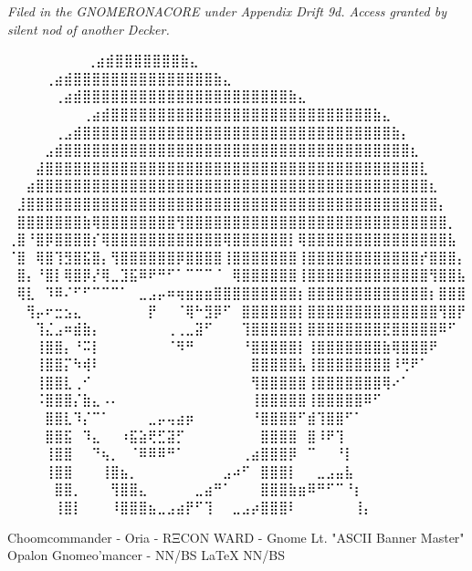 \vspace{1.5em}
\begin{flushright}
\textit{Filed in the GNOMERONACORE under Appendix Drift 9d. Access granted by silent nod of another Decker.}
\end{flushright}


\iffalse
⠀⠀⠀⠀⠀⠀             ⠀⠀⢀⣴⣾⣿⣿⣿⣿⣿⣿⣿⣷⣄⠀⠀⠀⠀⠀⠀⠀⠀
⠀⠀⠀  ⠀      ⠀⠀⠀⠀⢀⣴⣾⣿⣿⣿⣿⣿⣿⣿⣿⣿⣿⣿⣿⣿⣿⣿⣷⣄⠀⠀⠀⠀⠀⠀⠀⠀
⠀⠀ ⠀   ⠀⠀⠀⠀⠀⢀⣴⣾⣿⣿⣿⣿⣿⣿⣿⣿⣿⣿⣿⣿⣿⣿⣿⣿⣿⣿⣿⣿⣿⣿⣷⣄⠀⠀⠀⠀⠀⠀⠀⠀
⠀⠀⠀⠀⠀⠀⠀⠀⢀⣴⣾⣿⣿⣿⣿⣿⣿⣿⣿⣿⣿⣿⣿⣿⣿⣿⣿⣿⣿⣿⣿⣿⣿⣿⣿⣿⣿⣿⣿⣷⣄⠀⠀⠀⠀⠀⠀⠀⠀
⠀⠀⠀⠀⠀⢀⣠⣾⣿⣿⣿⣿⣿⣿⣿⣿⣿⣿⣿⣿⣿⣿⣿⣿⣿⣿⣿⣿⣿⣿⣿⣿⣿⣿⣿⣿⣿⣿⣿⣿⣿⣷⡄⠀⠀⠀⠀⠀⠀
⠀⠀⠀⠀⣠⣾⣿⣿⣿⣿⣿⣿⣿⣿⣿⣿⣿⣿⣿⣿⣿⣿⣿⣿⣿⣿⣿⣿⣿⣿⣿⣿⣿⣿⣿⣿⣿⣿⣿⣿⣿⣿⣿⣆⠀⠀⠀⠀⠀
⠀⠀⠀⣼⣿⣿⣿⣿⣿⣿⣿⣿⣿⣿⣿⣿⣿⣿⣿⣿⣿⣿⣿⣿⣿⣿⣿⣿⣿⣿⣿⣿⣿⣿⣿⣿⣿⣿⣿⣿⣿⣿⣿⣿⣇⠀⠀⠀⠀
⠀⠀⣴⣿⣿⣿⣿⣿⣿⣿⣿⣿⣿⣿⣿⣿⣿⣿⣿⣿⣿⣿⣿⣿⣿⣿⣿⣿⣿⣿⣿⣿⣿⣿⣿⣿⣿⣿⣿⣿⣿⣿⣿⣿⣿⣆⠀⠀⠀
⠀⣸⣿⣿⣿⣿⣿⣿⣿⣿⣿⣿⣿⣿⣿⣿⣿⣿⣿⣿⣿⣿⣿⣿⣿⣿⣿⣿⣿⣿⣿⣿⣿⣿⣿⣿⣿⣿⣿⣿⣿⣿⣿⣿⣿⣿⡄⠀⠀
⠀⣿⣿⣿⣿⣿⣿⣿⣷⢿⣿⣿⣿⣿⣿⣿⣿⣿⢻⣿⣿⣿⣿⣿⣿⣿⣿⣿⣿⣿⣿⣿⣿⣿⣿⣿⣿⣿⣿⣿⣿⣿⣿⣿⣿⣿⣿⡀⠀
⢀⣿⠘⣿⡿⣿⣿⣿⣿⡎⢿⣿⣿⣿⣿⣿⣿⣿⣿⣿⣿⣿⣿⢿⣿⣿⣿⣿⣿⣿⡇⢿⣿⣿⣿⣿⣿⣿⣿⣿⣿⣿⣿⣿⣿⣿⣿⣧⠀
⠈⣿⠀⢿⣿⢹⣻⣿⣯⣿⡄⢻⣿⣿⣿⣿⣿⣿⡿⣿⣿⣿⣿⢸⣿⣿⣿⣿⣿⣿⣿⢸⣿⣿⣿⣿⣿⣿⣿⣿⣿⣿⣿⣿⡞⣿⣿⣿⡄
⠀⣿⡄⠘⣿⡇⢿⣿⡿⡜⢿⣀⣹⣯⠿⠟⠛⠋⠁⠉⠉⠉⠈⠀⢿⣿⣿⣿⣿⣿⣿⢸⣿⣿⣿⣿⣿⣿⣿⣿⣿⣿⣿⣿⣿⢻⣿⣿⣧
⠀⢿⣇⠀⠹⠿⠌⠋⠋⠉⠉⠉⠁⠀⣀⣠⡤⠶⢶⣶⣶⣶⣿⣿⣿⣿⣿⣿⣿⣿⣿⡆⣿⣿⣿⣿⣿⣿⣿⣿⣿⣿⣿⣿⣿⡆⣿⣿⣿
⠀⠀⢻⡤⠖⣒⣢⣄⠀⠀⠀⠀⠀⠀⠀⡟⠀⠀⠈⢿⠓⣻⡿⠋⠀⣿⣿⣿⣿⣿⣿⡇⣿⣿⣿⣿⣿⣿⣿⣿⣿⣿⣿⣿⣿⣿⢻⣿⡟
⠀⠀⠀⢹⣌⣠⠶⣾⣷⡄⠀⠀⠀⠀⠀⠀⠀⢀⢀⣀⣽⠋⠀⠀⠀⢹⣿⣿⣿⣿⣿⡇⣿⣿⣿⣿⣿⣿⣿⣿⣟⣿⣿⣿⣿⣿⠿⠋⠀
⠀⠀⠀⢸⣿⣿⡄⠘⠭⡇⠀⠀⠀⠀⠀⠀⠀⠈⠻⠛⠀⠀⠀⠀⠀⠘⣿⣿⣿⣿⣿⡇⢸⣿⣿⣿⣿⣿⣿⣿⣷⢿⣿⣿⣿⠟⠀⠀⠀
⠀⠀⠀⢸⣿⣿⡍⠳⢾⠇⠀⠀⠀⠀⠀⠀⠀⠀⠀⠀⠀⠀⠀⠀⠀⠀⣿⣿⣿⣿⣿⣧⢸⣿⣿⣿⣿⣿⣿⣿⣿⠸⢛⠟⠁⠀⠀⠀⠀
⠀⠀⠀⢸⣿⣿⣇⢀⠊⠀⠀⠀⠀⠀⠀⠀⠀⠀⠀⠀⠀⠀⠀⠀⠀⠀⢻⣿⣿⣿⣿⣿⢸⣿⣿⣿⣿⣿⣿⣿⢿⠔⠁⠀⠀⠀⠀⠀⠀
⠀⠀⠀⠨⣿⣿⣿⡌⣷⣄⠠⠄⠀⠀⠀⠀⠀⠀⠀⠀⠀⠀⠀⠀⠀⠀⢸⣿⣿⣿⣿⣿⢸⣿⣿⣿⣿⣿⠿⠋⠀⠀⠀⠀⠀⠀⠀⠀⠀
⠀⠀⠀⠀⣿⣿⣇⠹⡌⠉⠁⠀⠀⠀⠀⣀⡤⢤⣴⡶⠀⠀⠀⠀⠀⠀⠘⣿⣿⣿⣿⠋⣾⢹⣿⣿⠋⠁⠀⠀⠀⠀⠀⠀⠀⠀⠀⠀⠀
⠀⠀⠀⠀⣿⣿⣯⠀⠹⣄⠀⠀⠰⣯⣵⢟⣋⣽⡋⠀⠀⠀⠀⠀⠀⠀⠀⣿⣿⣿⣿⠀⣿⠸⠟⢹⠀⠀⠀⠀⠀⠀⠀⠀⠀⠀⠀⠀⠀
⠀⠀⠀⠀⢸⣿⣿⠀⠀⠙⢦⡀⠀⠈⠿⠿⠿⠛⠁⠀⠀⠀⠀⠀⠀⢀⣴⣿⣿⣿⡿⠀⠉⠀⠀⠘⡇⠀⠀⠀⠀⠀⠀⠀⠀⠀⠀⠀⠀
⠀⠀⠀⠀⢸⣿⣿⠀⠀⠀⢸⣿⣦⡀⠀⠀⠀⠀⠀⠀⠀⠀⠀⣠⠴⠋⠀⣿⣿⣿⡇⠀⠀⣀⣠⣤⣧⠀⠀⠀⠀⠀⠀⠀⠀⠀⠀⠀⠀
⠀⠀⠀⠀⠀⣿⣿⡀⠀⠀⠀⢻⣿⣿⣄⠀⠀⠀⠀⠀⣀⣴⠛⠁⠀⠀⠀⣿⣿⣿⣷⣶⠿⠛⠋⠉⠘⡆⠀⠀⠀⠀⠀⠀⠀⠀⠀⠀⠀
⠀⠀⠀⠀⠀⢸⣿⡇⠀⠀⠀⠸⣿⣿⣿⣦⣀⣠⣴⡟⠋⢹⠀⠀⣀⣠⡴⣿⣿⣿⠇⠀⠀⠀⠀⠀⠀⢸⡄⠀⠀⠀⠀⠀⠀⠀⠀⠀⠀

Choomcommander - Oria - RΞCON WARD - Gnome Lt. "ASCII Banner Master"
             Opalon Gnomeo'mancer - NN/BS LaTeX{} NN/BS

